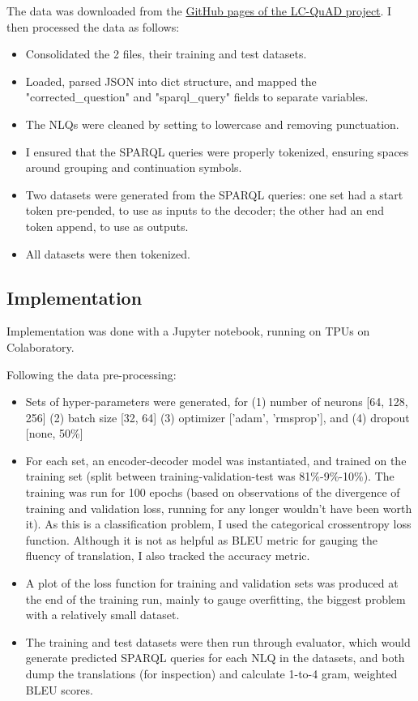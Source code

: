 \documentclass[12pt]{article}
\begin{document}
The data was downloaded from the
\href{https://github.com/AskNowQA/LC-QuAD/}{GitHub pages of the LC-QuAD project}.
I then processed the data as follows:

\begin{itemize}
  \item 
    Consolidated the 2 files, their training and test datasets.
  \item 
    Loaded, parsed JSON into dict structure, and mapped the 
    "corrected\_question" and "sparql\_query" fields to separate variables.
  \item 
    The NLQs were cleaned by setting to lowercase and removing punctuation.
  \item 
    I ensured that the SPARQL queries were properly tokenized, ensuring spaces
    around grouping and continuation symbols.
  \item
    Two datasets were generated from the SPARQL queries: one set had a 
    start token pre-pended, to use as inputs to the decoder; the other
    had an end token append, to use as outputs.
  \item 
    All datasets were then tokenized.
\end{itemize}

\subsection{Implementation}\label{implementation}

Implementation was done with a Jupyter notebook, running on TPUs on Colaboratory.

Following the data pre-processing:

\begin{itemize}
  \item  
    Sets of hyper-parameters were generated, for (1) number of neurons
    [64, 128, 256] (2) batch size [32, 64] (3) optimizer ['adam', 'rmsprop'], 
    and (4) dropout [none, 50\%]
  \item
    For each set, an encoder-decoder model was instantiated, and trained on 
    the training set (split between training-validation-test was 81\%-9\%-10\%).
    The training was run for 100 epochs (based on observations of the divergence
    of training and validation loss, running for any longer wouldn't have been
    worth it). As this is a classification problem, I used the categorical crossentropy
    loss function. Although it is not as helpful as BLEU metric for gauging the 
    fluency of translation, I also tracked the accuracy metric.
  \item 
    A plot of the loss function for training and validation sets was produced at
    the end of the training run, mainly to gauge overfitting, the biggest problem
    with a relatively small dataset.
  \item 
    The training and test datasets were then run through evaluator, which would 
    generate predicted SPARQL queries for each NLQ in the datasets, and both
    dump the translations (for inspection) and calculate 1-to-4 gram, weighted
    BLEU scores.
\end{itemize}
\end{document}
